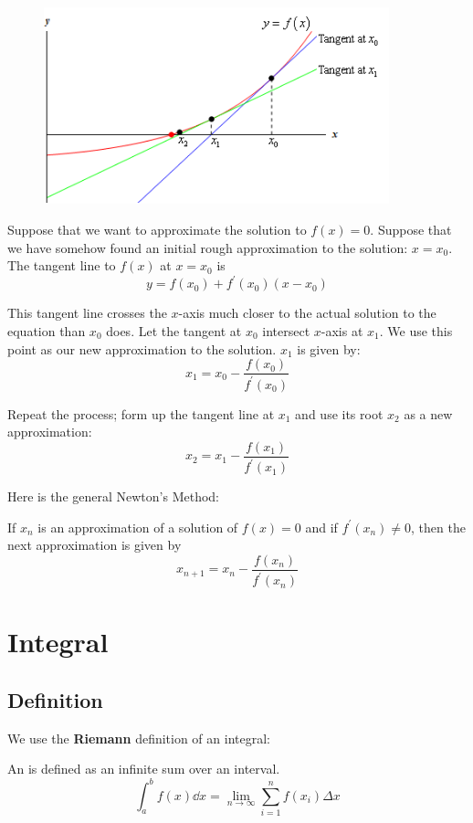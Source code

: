 \begin{figure}[H]
    \centering
    \includegraphics[width=10cm]{images/newton_method.png}
\end{figure}

Suppose that we want to approximate the solution to $f(x)=0$. Suppose that we have somehow found an initial rough approximation to the solution: $x=x_0$. The tangent line to $f(x)$ at $x=x_0$ is
\[ y = f(x_0) + f^\prime(x_0)(x-x_0) \]

This tangent line crosses the $x$-axis much closer to the actual solution to the equation than $x_0$ does. Let the tangent at $x_0$ intersect $x$-axis at $x_1$. We use this point as our new approximation to the solution. $x_1$ is given by:
\[ x_1 = x_0 - \frac{f(x_0)}{f^\prime(x_0)} \]

Repeat the process; form up the tangent line at $x_1$ and use its root $x_2$ as a new approximation:
\[ x_2 = x_1 - \frac{f(x_1)}{f^\prime(x_1)} \]

Here is the general Newton's Method:
\begin{theorem}
If $x_n$ is an approximation of a solution of $f(x)=0$ and if $f^\prime(x_n) \neq 0$, then the next approximation is given by
\[ x_{n+1} = x_n - \frac{f(x_n)}{f^\prime(x_n)} \]
\end{theorem}
\pagebreak

\chapter{Integral}
\section{Definition}
We use the \textbf{Riemann} definition of an integral:
\begin{definition}
An  is defined as an infinite sum over an interval.
\begin{equation}
\int_a^b f(x) \dd{x} = \lim_{n \to \infty} \sum_{i=1}^n f(x_i) \Delta x
\end{equation}
\end{definition}

